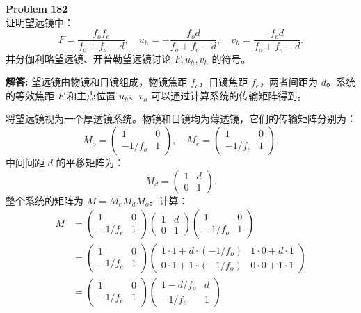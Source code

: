 \documentclass[12pt, a4paper, oneside]{ctexart}
\newenvironment{solution}{\par\noindent\textbf{解答:}\quad}{\par}
\begin{document}
\begin{mdframed}[backgroundcolor=gray!10, linewidth=0pt]
    \textbf{Problem 182} \\
    证明望远镜中：
    \[
    F = \frac{f_o f_e}{f_o + f_e - d}, \quad u_h = -\frac{f_o d}{f_o + f_e - d}, \quad v_h = \frac{f_e d}{f_o + f_e - d}.
    \]
    并分伽利略望远镜、开普勒望远镜讨论 $F, u_h, v_h$ 的符号。
\end{mdframed}
\begin{solution}
    望远镜由物镜和目镜组成，物镜焦距 $f_o$，目镜焦距 $f_e$，两者间距为 $d$。系统的等效焦距 $F$ 和主点位置 $u_h$、$v_h$ 可以通过计算系统的传输矩阵得到。

    将望远镜视为一个厚透镜系统。物镜和目镜均为薄透镜，它们的传输矩阵分别为：
    \[
    M_o = \begin{pmatrix} 1 & 0 \\ -1/f_o & 1 \end{pmatrix}, \quad M_e = \begin{pmatrix} 1 & 0 \\ -1/f_e & 1 \end{pmatrix}.
    \]
    中间间距 $d$ 的平移矩阵为：
    \[
    M_d = \begin{pmatrix} 1 & d \\ 0 & 1 \end{pmatrix}.
    \]
    整个系统的矩阵为 $M = M_e M_d M_o$。计算：
    \begin{align*}
        M &= \begin{pmatrix} 1 & 0 \\ -1/f_e & 1 \end{pmatrix} \begin{pmatrix} 1 & d \\ 0 & 1 \end{pmatrix} \begin{pmatrix} 1 & 0 \\ -1/f_o & 1 \end{pmatrix} \\
        &= \begin{pmatrix} 1 & 0 \\ -1/f_e & 1 \end{pmatrix} \begin{pmatrix} 1 \cdot 1 + d \cdot (-1/f_o) & 1 \cdot 0 + d \cdot 1 \\ 0 \cdot 1 + 1 \cdot (-1/f_o) & 0 \cdot 0 + 1 \cdot 1 \end{pmatrix} \\
        &= \begin{pmatrix} 1 & 0 \\ -1/f_e & 1 \end{pmatrix} \begin{pmatrix} 1 - d/f_o & d \\ -1/f_o & 1 \end{pmatrix} \\

\end{align*}
\end{solution}
\end{document}
